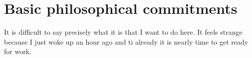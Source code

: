 \chapter{Basic philosophical commitments}
\label{sec:org77b1b73}
It is difficult to say precisely what it is that I want to do here.
It feels strange because I just woke up an hour ago and ti already it is nearly
time to get ready for work.
